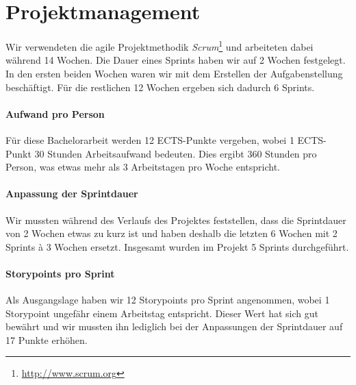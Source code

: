 \chapter{Projektmanagement}
\label{projektmanagement}

Wir verwendeten die agile Projektmethodik \emph{Scrum}\footnote{\url{http://www.scrum.org}} und arbeiteten dabei während 14 Wochen.
Die Dauer eines Sprints haben wir auf 2 Wochen festgelegt.
In den ersten beiden Wochen waren wir mit dem Erstellen der Aufgabenstellung beschäftigt.
Für die restlichen 12 Wochen ergeben sich dadurch 6 Sprints.

\subsubsection{Aufwand pro Person}
Für diese Bachelorarbeit werden 12 ECTS-Punkte vergeben, wobei 1 ECTS-Punkt 30 Stunden Arbeitsaufwand bedeuten.
Dies ergibt 360 Stunden pro Person, was etwas mehr als 3 Arbeitstagen pro Woche entspricht.

\subsubsection{Anpassung der Sprintdauer}
Wir mussten während des Verlaufs des Projektes feststellen, dass die Sprintdauer von 2 Wochen etwas zu kurz ist und haben deshalb die letzten 6 Wochen mit 2 Sprints à 3 Wochen ersetzt.
Insgesamt wurden im Projekt 5 Sprints durchgeführt. 

\subsubsection{Storypoints pro Sprint}
Als Ausgangslage haben wir 12 Storypoints pro Sprint angenommen, wobei 1 Storypoint ungefähr einem Arbeitstag entspricht. 
Dieser Wert hat sich gut bewährt und wir mussten ihn lediglich bei der Anpassungen der Sprintdauer auf 17 Punkte erhöhen.

